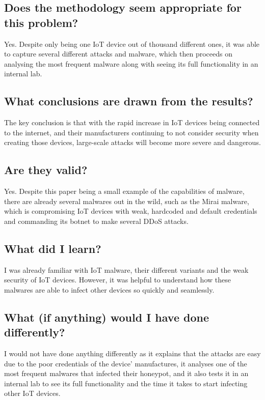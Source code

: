\documentclass[11pt,a4paper]{article}
\begin{document}
\subsection*{Does the methodology seem appropriate for this problem?}
Yes. Despite only being one IoT device out of thousand different ones, it was able to capture several different attacks and malware, which then proceeds on analysing the most frequent malware along with seeing its full functionality in an internal lab.

\subsection*{What conclusions are drawn from the results?}
The key conclusion is that with the rapid increase in IoT devices being connected to the internet, and their manufacturers continuing to not consider security when creating those devices, large-scale attacks will become more severe and dangerous.

\subsection*{Are they valid?}
Yes. Despite this paper being a small example of the capabilities of malware, there are already several malwares out in the wild, such as the Mirai malware, which is compromising IoT devices with weak, hardcoded and default credentials and commanding its botnet to make several DDoS attacks. 

\subsection*{What did I learn?}
I was already familiar with IoT malware, their different variants and the weak security of IoT devices. However, it was helpful to understand how these malwares are able to infect other devices so quickly and seamlessly. 

\subsection*{What (if anything) would I have done differently?}
I would not have done anything differently as it explains that the attacks are easy due to the poor credentials of the device’ manufactures, it analyses one of the most frequent malwares that infected their honeypot, and it also tests it in an internal lab to see its full functionality and the time it takes to start infecting other IoT devices.
\end{document}

